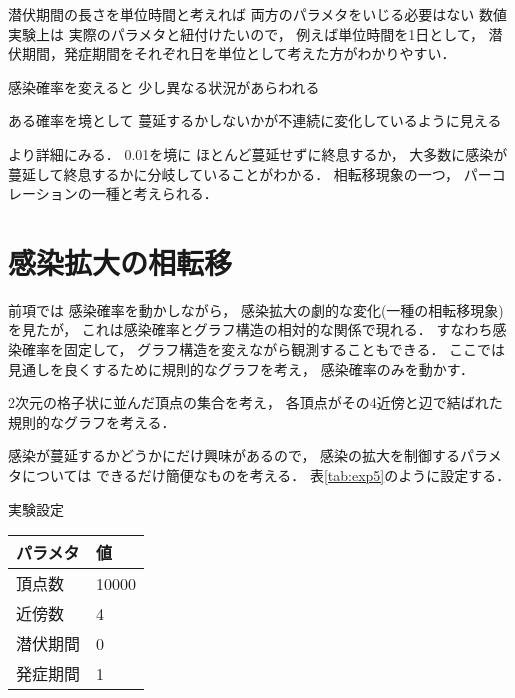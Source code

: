 \documentclass[10pt,oneside]{scrartcl}
\begin{document}
潜伏期間の長さを単位時間と考えれば
両方のパラメタをいじる必要はない
数値実験上は
実際のパラメタと紐付けたいので，
例えば単位時間を1日として，
潜伏期間，発症期間をそれぞれ日を単位として考えた方がわかりやすい．

感染確率を変えると
少し異なる状況があらわれる

ある確率を境として
蔓延するかしないかが不連続に変化しているように見える

\begin{figure*}%
  \centering
\end{figure*}

より詳細にみる．
0.01を境に
ほとんど蔓延せずに終息するか，
大多数に感染が蔓延して終息するかに分岐していることがわかる．
相転移現象の一つ，
パーコレーションの一種と考えられる．

\begin{figure*}%
  \centering
\end{figure*}

\section{感染拡大の相転移}
\label{sec:orgaa397f5}

前項では
感染確率を動かしながら，
感染拡大の劇的な変化(一種の相転移現象)を見たが，
これは感染確率とグラフ構造の相対的な関係で現れる．
すなわち感染確率を固定して，
グラフ構造を変えながら観測することもできる．
ここでは
見通しを良くするために規則的なグラフを考え，
感染確率のみを動かす．


2次元の格子状に並んだ頂点の集合を考え，
各頂点がその4近傍と辺で結ばれた規則的なグラフを考える．

感染が蔓延するかどうかにだけ興味があるので，
感染の拡大を制御するパラメタについては
できるだけ簡便なものを考える．
表\ref{tab:exp5}のように設定する．

\begin{margintable}
  \caption{実験設定}
  \label{tab:exp5}
  \small
  \begin{tabular}{ll}
    \toprule
    パラメタ&値 \\
    \midrule
    頂点数&10000 \\
    近傍数&4 \\
    潜伏期間&0 \\
    発症期間&1 \\
    \bottomrule
  \end{tabular}
\end{margintable}
\end{document}
